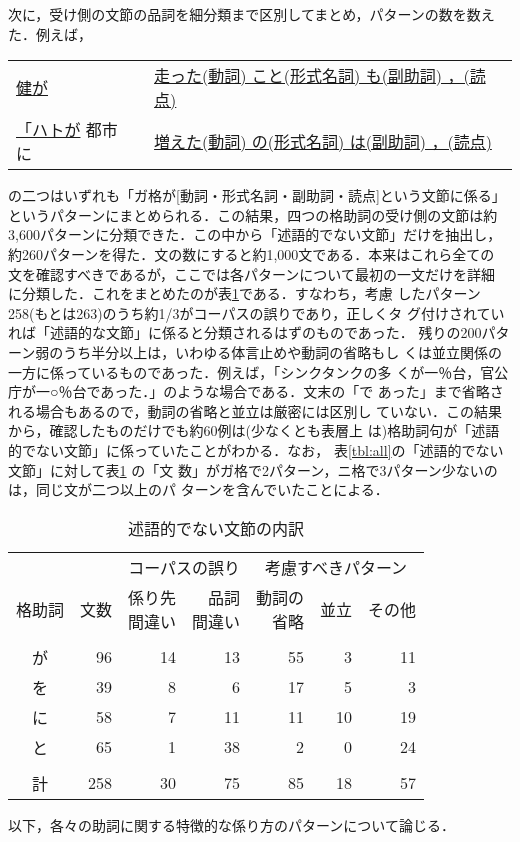 次に，受け側の文節の品詞を細分類まで区別してまとめ，パターンの数を数え
た．例えば，
\begin{center}
\begin{tabular}{ll}
\underline{健が} &
	\underline{走った(動詞) こと(形式名詞) も(副助詞) ，(読点)}\\
\underline{「ハトが} 都市 に &
	\underline{増えた(動詞) の(形式名詞) は(副助詞) ，(読点)}
\end{tabular}
\end{center}
の二つはいずれも「ガ格が[動詞・形式名詞・副助詞・読点]という文節に係る」
というパターンにまとめられる．この結果，四つの格助詞の受け側の文節は約
3,600パターンに分類できた．この中から「述語的でない文節」だけを抽出し，
約260パターンを得た．文の数にすると約1,000文である．本来はこれら全ての
文を確認すべきであるが，ここでは各パターンについて最初の一文だけを詳細
に分類した．これをまとめたのが表\ref{tbl:detail}である．すなわち，考慮
したパターン258(もとは263)のうち約1/3がコーパスの誤りであり，正しくタ
グ付けされていれば「述語的な文節」に係ると分類されるはずのものであった．
残りの200パターン弱のうち半分以上は，いわゆる体言止めや動詞の省略もし
くは並立関係の一方に係っているものであった．例えば，「シンクタンクの多
くが一％台，官公庁が一○％台であった．」のような場合である．文末の「で
あった」まで省略される場合もあるので，動詞の省略と並立は厳密には区別し
ていない．この結果から，確認したものだけでも約60例は(少なくとも表層上
は)格助詞句が「述語的でない文節」に係っていたことがわかる．なお，
表\ref{tbl:all}の「述語的でない文節」に対して表\ref{tbl:detail} の「文
数」がガ格で2パターン，ニ格で3パターン少ないのは，同じ文が二つ以上のパ
ターンを含んでいたことによる．

\begin{table}
\caption{述語的でない文節の内訳}\label{tbl:detail}
\begin{center}
\begin{tabular}{c|r|r|r|r|r|r}
	&& \multicolumn{2}{c|}{コーパスの誤り} &
		\multicolumn{3}{c}{考慮すべきパターン}\\[2pt]
\cline{3-7}
\rule{0pt}{25pt}格助詞 & 文数 & \shortstack{係り先\\[-2pt] 間違い} &
	\shortstack{品詞\\[-2pt] 間違い} &
	\shortstack{動詞の\\[-2pt] 省略} & 並立 & その他\\[2pt]
\hline
&&&&&&\\[-7pt]
が &  96 &  14 &  13 &  55 &   3 &  11\\[2pt]
を &  39 &   8 &   6 &  17 &   5 &   3\\[2pt]
に &  58 &   7 &  11 &  11 &  10 &  19\\[2pt]
と &  65 &   1 &  38 &   2 &   0 &  24\\[2pt]
\hline
&&&&&&\\[-7pt]
計 & 258 &  30 &  75 &  85 &  18 &  57
\end{tabular}
\end{center}
\end{table}
以下，各々の助詞に関する特徴的な係り方のパターンについて論じる．

